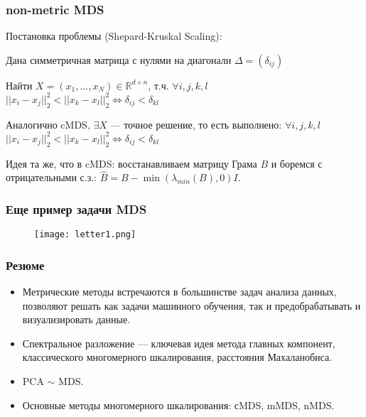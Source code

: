 \documentclass[10pt]{beamer}
\newcommand{\real}{\mathbb{R}}
\begin{document}
\begin{frame}
\frametitle{non-metric MDS}

Постановка проблемы (Shepard-Kruskal Scaling):

\vspace{\baselineskip}
Дана симметричная матрица с нулями на диагонали $\Delta = (\delta_{ij})$ 

\vspace{\baselineskip}
Найти $X = (x_1, ..., x_N) \in \real^{d \times n}$, т.ч. $\forall i, j, k, l$ $||x_i - x_j||_2^2 < ||x_k - x_l||_2^2 \Longleftrightarrow \delta_{ij} < \delta_{kl}$

\vspace{\baselineskip}
Аналогично cMDS, $\exists X$ --- точное решение, то есть выполнено:
$\forall i, j, k, l$ $||x_i - x_j||_2^2 < ||x_k - x_l||_2^2 \Longleftrightarrow \delta_{ij} < \delta_{kl}$
 
\vspace{\baselineskip}
Идея та же, что в cMDS: восстанавливаем матрицу Грама $B$ и боремся с отрицательными с.з.: $\widehat{B} = B - \min(\lambda_{min}(B), 0) I$.
\end{frame}

\begin{frame}
\frametitle{Еще пример задачи MDS}

\begin{figure}
\centering
        \texttt{[image: letter1.png]}
\end{figure}

\end{frame}

\begin{frame}
\frametitle{Резюме}
\begin{itemize}
\item{Метрические методы встречаются в большинстве задач анализа данных, позволяют решать как задачи машинного обучения, так и предобрабатывать и визуализировать данные.}
\item{Спектральное разложение --- ключевая идея метода главных компонент, классического многомерного шкалирования, расстояния Махаланобиса.}
\item{PCA $\sim$ MDS.}
\item{Основные методы многомерного шкалирования: сMDS, mMDS, nMDS.}
\end{itemize}
\end{frame}
\end{document}
